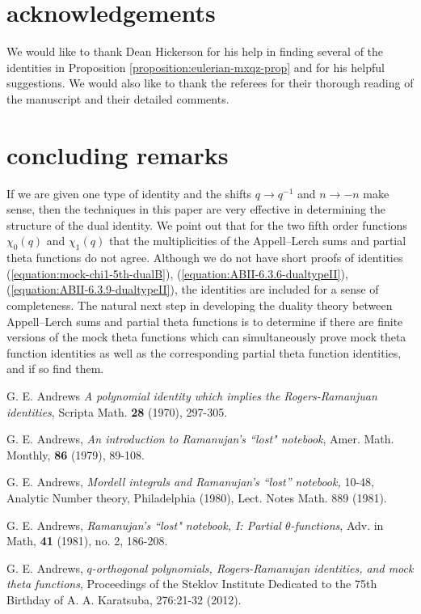 \documentclass[12pt,reqno]{amsart}
\theoremstyle{remark}
\theoremstyle{definition}
\numberwithin{theorem}{section} \numberwithin{equation}{section}
\numberwithin{example}{section}
\begin{document}
{\section{acknowledgements} We would like to thank Dean Hickerson for his help in finding several of the identities in Proposition \ref{proposition:eulerian-mxqz-prop} and for his helpful suggestions.  We would also like to thank the referees for their thorough reading of the manuscript and their detailed comments.

\section{concluding remarks}
If we are given one type of identity and the shifts $q\rightarrow q^{-1}$ and $n\rightarrow -n$ make sense, then the techniques in this paper are very effective in determining the structure of the dual identity.   We point out that for the two fifth order functions $\chi_0(q)$ and $\chi_1(q)$ that the multiplicities of the Appell--Lerch sums and partial theta functions do not agree.    Although we do not have short proofs of identities (\ref{equation:mock-chi1-5th-dualB}), (\ref{equation:ABII-6.3.6-dualtypeII}), (\ref{equation:ABII-6.3.9-dualtypeII}), the identities are included for a sense of completeness.   The natural next step in developing the duality theory between Appell--Lerch sums and partial theta functions is to determine if there are finite versions of the mock theta functions which can simultaneously prove mock theta function identities as well as the corresponding partial theta function identities, and if so find them.

\begin{thebibliography}{999999}
 G. E. Andrews {\em A polynomial identity which implies the Rogers-Ramanjuan identities}, Scripta Math. {\bf 28} (1970), 297-305.

 G. E. Andrews, {\em An introduction to Ramanujan's ``lost" notebook}, Amer. Math. Monthly, {\bf 86} (1979), 89-108.

 G. E. Andrews, {\em Mordell integrals and Ramanujan's ``lost'' notebook,} 10-48, Analytic Number theory, Philadelphia (1980), Lect. Notes Math. 889 (1981).

 G. E. Andrews, {\em Ramanujan's ``lost" notebook, I: Partial $\theta$-functions}, Adv. in Math, {\bf 41} (1981), no. 2, 186-208.

 G. E. Andrews, {\em $q$-orthogonal polynomials, Rogers-Ramanujan identities, and mock theta functions}, Proceedings of the Steklov Institute Dedicated to the 75th Birthday of A. A. Karatsuba, 276:21-32 (2012).


\end{thebibliography}}
\end{document}
